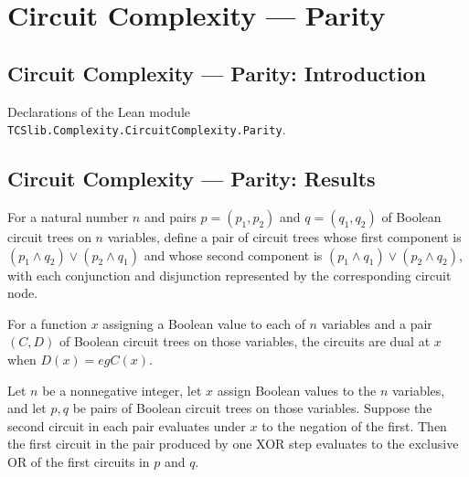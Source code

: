 \section{Circuit Complexity --- Parity}
\subsection*{Circuit Complexity --- Parity: Introduction}

Declarations of the Lean module \texttt{TCSlib.Complexity.CircuitComplexity.Parity}.

\subsection*{Circuit Complexity --- Parity: Results}

\begin{definition}
\label{BoolCircuit.xorNode}
\leanok
{}
For a natural number $n$ and pairs $p=(p_1,p_2)$ and $q=(q_1,q_2)$ of Boolean circuit
trees on $n$ variables, define a pair of circuit trees whose first component is
$(p_1\land q_2)\lor(p_2\land q_1)$ and whose second component is $(p_1\land
q_1)\lor(p_2\land q_2)$, with each conjunction and disjunction represented by the
corresponding circuit node.
\end{definition}

\begin{definition}
\label{BoolCircuit.IsDual}
\leanok
{}
For a function $x$ assigning a Boolean value to each of $n$ variables and a pair $(C,D)$
of Boolean circuit trees on those variables, the circuits are dual at $x$ when $D(x)=
eg C(x)$.
\end{definition}

\begin{theorem}
\label{BoolCircuit.xorNode_eval}
\leanok
{}
Let $n$ be a nonnegative integer, let $x$ assign Boolean values to the $n$ variables,
and let $p,q$ be pairs of Boolean circuit trees on those variables. Suppose the second
circuit in each pair evaluates under $x$ to the negation of the first. Then the first
circuit in the pair produced by one XOR step evaluates to the exclusive OR of the first
circuits in $p$ and $q$.
\end{theorem}

